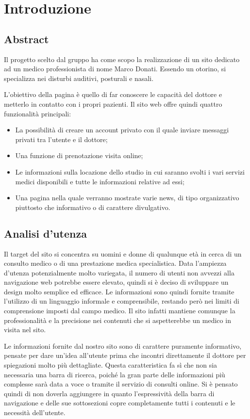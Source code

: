 \section{Introduzione}
\label{introduzione}


\subsection{Abstract}
Il progetto scelto dal gruppo ha come scopo la realizzazione di un sito dedicato ad un medico professionista di nome Marco Donati. Essendo un otorino, si specializza nei disturbi auditivi, posturali e nasali.

L’obiettivo della pagina è quello di far conoscere le capacità del dottore e metterlo in contatto con i propri pazienti.
Il sito web offre quindi quattro funzionalità principali:
\begin{itemize}
\item La possibilità di creare un account privato con il quale inviare messaggi privati tra l’utente e il dottore;
\item Una funzione di prenotazione visita online;
\item Le informazioni sulla locazione dello studio in cui saranno svolti i vari servizi medici disponibili e tutte le informazioni relative ad essi;
\item Una pagina nella quale verranno mostrate varie news, di tipo organizzativo piuttosto che informativo o di carattere divulgativo.
\end{itemize}

\subsection{Analisi d'utenza}
Il target del sito si concentra su uomini e donne di qualunque età in cerca di un consulto medico o di una prestazione medica specialistica.
Data l’ampiezza d’utenza potenzialmente molto variegata, il numero di utenti non avvezzi alla navigazione web potrebbe essere elevato, quindi si è deciso di sviluppare un design molto semplice ed efficace.
Le informazioni sono quindi fornite tramite l’utilizzo di un linguaggio informale e comprensibile, restando però nei limiti di comprensione imposti dal campo medico.
Il sito infatti mantiene comunque la professionalità e la precisione nei contenuti che si aspetterebbe un medico in visita nel sito.

Le informazioni fornite dal nostro sito sono di carattere puramente informativo, pensate per dare un’idea all’utente prima che incontri direttamente il dottore per spiegazioni molto più dettagliate.
Questa caratteristica fa sì che non sia necessaria una barra di ricerca, poiché la gran parte delle informazioni più complesse sarà data a voce o tramite il servizio di consulti online.
Si è pensato quindi di non doverla aggiungere in quanto l’espressività della barra di navigazione e delle sue sottosezioni copre completamente tutti i contenuti e le necessità dell’utente.


